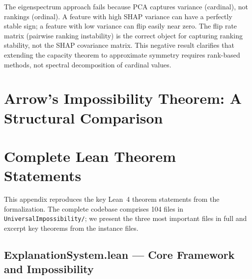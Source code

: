 \documentclass[11pt,a4paper]{article}
\begin{document}
The eigenspectrum approach fails because PCA captures variance (cardinal), not rankings (ordinal).  A feature with high SHAP variance can have a perfectly stable sign; a feature with low variance can flip easily near zero.  The flip rate matrix (pairwise ranking instability) is the correct object for capturing ranking stability, not the SHAP covariance matrix.  This negative result clarifies that extending the capacity theorem to approximate symmetry requires rank-based methods, not spectral decomposition of cardinal values.





\clearpage
\appendix

\section{Arrow's Impossibility Theorem: A Structural Comparison}
\label{app:arrow}



\section{Complete Lean Theorem Statements}
\label{app:lean}

This appendix reproduces the key Lean~4 theorem statements from the
formalization.  The complete codebase comprises 104 files in
\texttt{UniversalImpossibility/}; we present the three most important files
in full and excerpt key theorems from the instance files.

\subsection{ExplanationSystem.lean --- Core Framework and Impossibility}
\label{app:lean-explanation-system}
\end{document}
